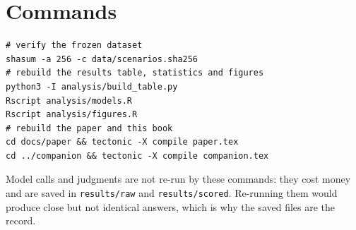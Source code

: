 \section{Commands}

\begin{lstlisting}
# verify the frozen dataset
shasum -a 256 -c data/scenarios.sha256
# rebuild the results table, statistics and figures
python3 -I analysis/build_table.py
Rscript analysis/models.R
Rscript analysis/figures.R
# rebuild the paper and this book
cd docs/paper && tectonic -X compile paper.tex
cd ../companion && tectonic -X compile companion.tex
\end{lstlisting}

Model calls and judgments are not re-run by these commands: they cost money and are saved in \texttt{results/raw} and \texttt{results/scored}. Re-running them would produce close but not identical answers, which is why the saved files are the record.
